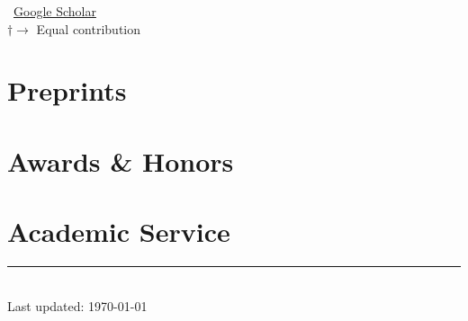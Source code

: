 \documentclass[11pt]{article} %
\begin{document}
\vspace{-.75em}
\small
\faGoogle~\href{https://scholar.google.co.kr/citations?user=l4UBOZAAAAAJ}{Google Scholar}\\
$\dagger \rightarrow$ Equal contribution
\normalsize

\begin{refsection}
\begin{refcontext}[sorting=cvyear]
\nocite{chung2025what,chung2026rethinking,chung2026webstep,chung2025don,chung2026geo,chung2026teaching,chung2025anytoany,kim2025speaking,chung2025mass,choi2024,chung2024selective,chung2024pun,chung2023vlis,chung2023long,yu2023fusing,lee2021acav100m,yu2021transitional}
\printbibliography[heading=none,resetnumbers=true]
\end{refcontext}
\end{refsection}

\begin{refsection}
\begin{refcontext}[sorting=cvyear]
\nocite{kim2026mixture,yoon2026a11yn,kim2025guidedog,park2025explain,nam2025iccv,lim2025visescape,kim2025egospeak,lee2024llms,choi2025canvas,chae2024language,han2023reading,yu2020character}
\printbibliography[heading=none,resetnumbers=true]
\end{refcontext}
\end{refsection}


\vspace{-1.0em}
\section*{Preprints}
\label{pubs_preprint}

\begin{refsection}
\begin{refcontext}[sorting=cvyear]
\nocite{oh2025seal,yoo2024hyperclova}
\printbibliography[heading=none,resetnumbers=true]
\end{refcontext}
\end{refsection}

\vspace{-1.0em}
\section*{Awards \& Honors}
\label{awards}


\vspace{-1.0em}
\section*{Academic Service}
\label{service}



\centering
\rule{0.25\linewidth}{0.4pt}\\
\medskip
Last updated: \today
\end{document}
